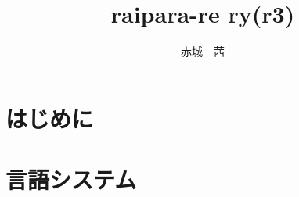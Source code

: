 \documentclass[a4paper, 12pt, titlepage]{ltjsarticle}
\title{raipara-re ry(r3)}
\author{赤城　茜}
\begin{document}
\maketitle

\tableofcontents \clearpage

\part{はじめに} \clearpage

 \clearpage

\part{言語システム} \clearpage

 \clearpage
 \clearpage
 \clearpage
 \clearpage
 \clearpage
\end{document}
